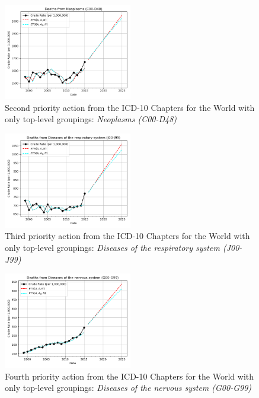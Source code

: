 \documentclass[10pt, a4paper, twocolumn]{IEEEconf}
\begin{document}
\begin{figure}[H]
  \centering
  \includegraphics[width=0.5\textwidth]{results/WORLD_ICD10_CHAPTER_ROOTS/Neoplasms_C00-D48_ets.png}
  \caption{Second priority action from the ICD-10 Chapters for the World with only top-level groupings: \textit{Neoplasms (C00-D48)}}\label{fig:k10b}
\end{figure}

\begin{figure}[H]
  \centering
  \includegraphics[width=0.5\textwidth]{results/WORLD_ICD10_CHAPTER_ROOTS/Diseases_of_the_respiratory_system_J00-J99_ets.png}
  \caption{Third priority action from the ICD-10 Chapters for the World with only top-level groupings: \textit{Diseases of the respiratory system (J00-J99)}}\label{fig:k10c}
\end{figure}

\begin{figure}[H]
  \centering
  \includegraphics[width=0.5\textwidth]{results/WORLD_ICD10_CHAPTER_ROOTS/Diseases_of_the_nervous_system_G00-G99_ets.png}
  \caption{Fourth priority action from the ICD-10 Chapters for the World with only top-level groupings: \textit{Diseases of the nervous system (G00-G99)}}\label{fig:k10d}
\end{figure}
\end{document}
